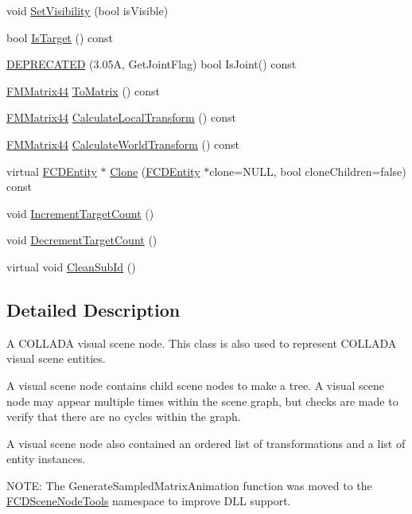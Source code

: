 \begin{DoxyCompactItemize}
void \hyperlink{classFCDSceneNode_a03230a78e14fc4be25c8e0b60b4e0222}{SetVisibility} (bool isVisible)
\item 
bool \hyperlink{classFCDSceneNode_a0c06b667e6f1545745e0ce30f8f8a044}{IsTarget} () const 
\item 
\hyperlink{classFCDSceneNode_a065c60f2bca63753e5cf1a3a6164af27}{DEPRECATED} (3.05A, GetJointFlag) bool IsJoint() const 
\item 
\hyperlink{classFMMatrix44}{FMMatrix44} \hyperlink{classFCDSceneNode_ad14e7dc6ec8ff1755f40eade0e607f70}{ToMatrix} () const 
\item 
\hyperlink{classFMMatrix44}{FMMatrix44} \hyperlink{classFCDSceneNode_a3b5a25aad0f37490746a081de68aaa7b}{CalculateLocalTransform} () const 
\item 
\hyperlink{classFMMatrix44}{FMMatrix44} \hyperlink{classFCDSceneNode_a1cf1f54c879c9ea5a6ae86fc5e1b7f70}{CalculateWorldTransform} () const 
\item 
virtual \hyperlink{classFCDEntity}{FCDEntity} $\ast$ \hyperlink{classFCDSceneNode_a5e115ea183d284ebcdff42d358c06e2e}{Clone} (\hyperlink{classFCDEntity}{FCDEntity} $\ast$clone=NULL, bool cloneChildren=false) const 
\item 
void \hyperlink{classFCDSceneNode_a8d2667408080453df148768c648695e9}{IncrementTargetCount} ()
\item 
void \hyperlink{classFCDSceneNode_a80bef3c1b93bc7f746a4d2af9c4e5883}{DecrementTargetCount} ()
\item 
virtual void \hyperlink{classFCDSceneNode_a58a0797e6705aa5fc048521a28e04f3b}{CleanSubId} ()
\end{DoxyCompactItemize}


\subsection{Detailed Description}
A COLLADA visual scene node. This class is also used to represent COLLADA visual scene entities.

A visual scene node contains child scene nodes to make a tree. A visual scene node may appear multiple times within the scene graph, but checks are made to verify that there are no cycles within the graph.

A visual scene node also contained an ordered list of transformations and a list of entity instances.

NOTE: The GenerateSampledMatrixAnimation function was moved to the \hyperlink{namespaceFCDSceneNodeTools}{FCDSceneNodeTools} namespace to improve DLL support. 

